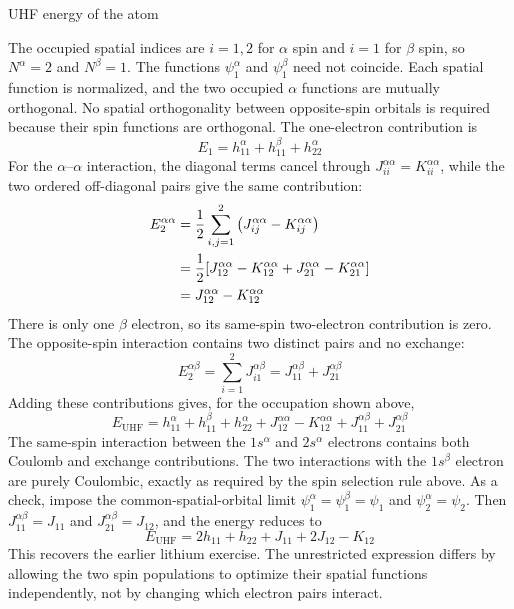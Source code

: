 \documentclass[11pt,a4paper,titlepage]{article}
\numberwithin{equation}{section}
\begin{document}
\begin{hfsolution}{UHF energy of the  atom}

The occupied spatial indices are $i=1,2$ for $\alpha$ spin and $i=1$
for $\beta$ spin, so $N^\alpha=2$ and $N^\beta=1$. The functions
$\psi_1^\alpha$ and $\psi_1^\beta$ need not coincide. Each spatial
function is normalized, and the two occupied $\alpha$ functions are
mutually orthogonal. No spatial orthogonality between opposite-spin
orbitals is required because their spin functions are orthogonal. The
one-electron contribution is
\begin{equation}
  E_1=h_{11}^\alpha+h_{11}^\beta+h_{22}^\alpha
\end{equation}
For the $\alpha$--$\alpha$ interaction, the diagonal terms cancel through
$J_{ii}^{\alpha\alpha}=K_{ii}^{\alpha\alpha}$, while the two ordered
off-diagonal pairs give the same contribution:
\begin{equation}
\begin{split}
  E_2^{\alpha\alpha}
  &=\frac12\sum_{i,j=1}^{2}
    \qty(J_{ij}^{\alpha\alpha}-K_{ij}^{\alpha\alpha})\\
  &=\frac12\qty[
    J_{12}^{\alpha\alpha}-K_{12}^{\alpha\alpha}
    +J_{21}^{\alpha\alpha}-K_{21}^{\alpha\alpha}]\\
  &=J_{12}^{\alpha\alpha}-K_{12}^{\alpha\alpha}
\end{split}
\end{equation}
There is only one $\beta$ electron, so its same-spin two-electron
contribution is zero. The opposite-spin interaction contains two distinct
pairs and no exchange:
\begin{equation}
  E_2^{\alpha\beta}
  =\sum_{i=1}^{2}J_{i1}^{\alpha\beta}
  =J_{11}^{\alpha\beta}+J_{21}^{\alpha\beta}
\end{equation}
Adding these contributions gives, for the occupation shown above,
\begin{equation}
  E_\text{UHF}
  =h_{11}^\alpha+h_{11}^\beta+h_{22}^\alpha
  +J_{12}^{\alpha\alpha}-K_{12}^{\alpha\alpha}
  +J_{11}^{\alpha\beta}+J_{21}^{\alpha\beta}
\end{equation}
The same-spin interaction between the $1s^\alpha$ and $2s^\alpha$ electrons
contains both Coulomb and exchange contributions. The two interactions with
the $1s^\beta$ electron are purely Coulombic, exactly as required by the spin
selection rule above.
As a check, impose the common-spatial-orbital limit
$\psi_1^\alpha=\psi_1^\beta=\psi_1$ and $\psi_2^\alpha=\psi_2$.
Then $J_{11}^{\alpha\beta}=J_{11}$ and
$J_{21}^{\alpha\beta}=J_{12}$, and the energy reduces to
\begin{equation}
  E_\text{UHF}
  =2h_{11}+h_{22}+J_{11}+2J_{12}-K_{12}
\end{equation}
This recovers the earlier lithium exercise. The unrestricted expression
differs by allowing the two spin populations to optimize their spatial
functions independently, not by changing which electron pairs interact.


\end{hfsolution}
\end{document}
